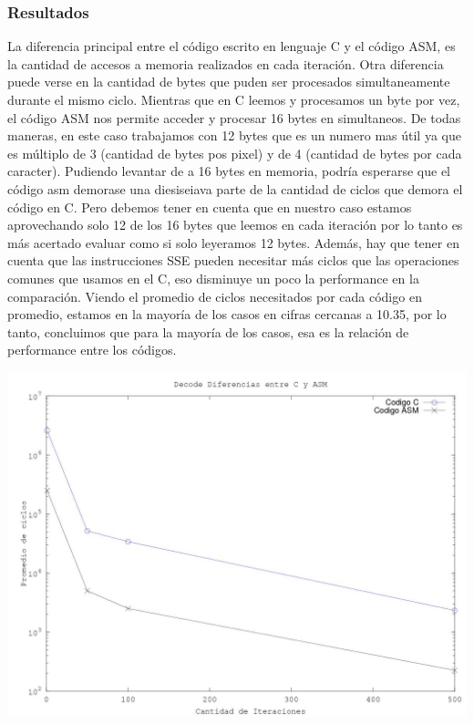 \subsubsection{Resultados}
La diferencia principal entre el c\'odigo escrito en lenguaje C y el c\'odigo ASM, es la cantidad de accesos a memoria realizados en cada iteraci\'on. Otra diferencia puede verse en la cantidad de bytes que puden ser procesados simultaneamente durante el mismo ciclo. Mientras que en C leemos y procesamos un byte por vez, el c\'odigo ASM nos permite acceder y procesar 16 bytes en simultaneos. De todas maneras, en este caso trabajamos con 12 bytes que es un numero mas \'util ya que es múltiplo de 3 (cantidad de bytes pos pixel)  y de 4 (cantidad de bytes por cada caracter).
\newline
Pudiendo levantar de a 16 bytes en memoria, podr\'ia esperarse que el c\'odigo asm demorase una diesiseiava parte de la cantidad de ciclos que demora el c\'odigo en C. Pero debemos tener en cuenta que en nuestro caso estamos aprovechando solo 12 de los 16 bytes que leemos en cada iteraci\'on por lo tanto es más acertado evaluar como si solo leyeramos 12 bytes. Adem\'as, hay que tener en cuenta que las instrucciones SSE pueden necesitar más ciclos que las operaciones comunes que usamos en el C, eso disminuye un poco la performance en la comparación. Viendo el promedio de ciclos necesitados por cada c\'odigo en promedio, estamos en la mayor\'ia de los casos en cifras cercanas a 10.35, por lo tanto, concluimos que para la mayoría de los casos, esa es la relaci\'on de performance entre los códigos.
\newline

\includegraphics[scale=0.7]{imagenes/octave1.jpg}

